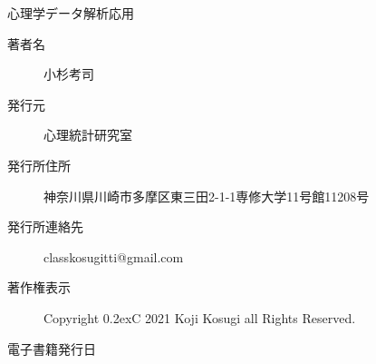 \begin{center}
	\Large{心理学データ解析応用}

	\vspace*{20pt}

	\large{}

	\large{}

	\vspace*{20pt}

	\begin{description}
		\item[著者名] 小杉考司
		\item[発行元] 心理統計研究室
		\item[発行所住所] 神奈川県川崎市多摩区東三田2-1-1専修大学11号館11208号
		\item[発行所連絡先] classkosugitti@gmail.com
		\item[著作権表示] Copyright \raise0.2ex\hbox{\textcircled{\scriptsize{C}}} 2021 Koji Kosugi all Rights Reserved.
		\item[電子書籍発行日] \date{\today}
	\end{description}
\end{center}
